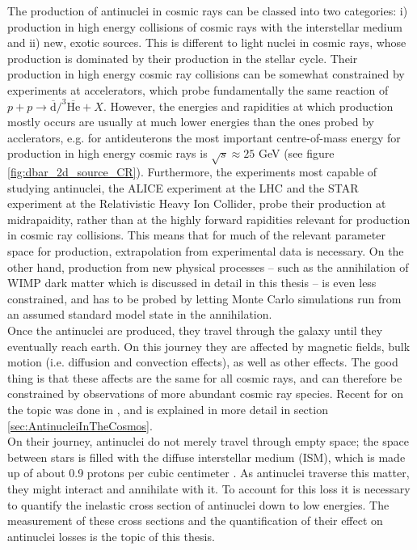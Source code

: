 The production of antinuclei in cosmic rays can be classed into two categories: i) production in high energy collisions of cosmic rays with the interstellar medium and ii) new, exotic sources. This is different to light nuclei in cosmic rays, whose production is dominated by their production in the stellar cycle. Their production in high energy cosmic ray collisions can be somewhat constrained by experiments at accelerators, which probe fundamentally the same reaction of $p + p \rightarrow \overline{\mathrm{d}}/^3{\overline{\mathrm{He}}} + X$. However, the energies and rapidities at which production mostly occurs are usually at much lower energies than the ones probed by acclerators, e.g. for antideuterons the most important centre-of-mass energy for production in high energy cosmic rays is $\sqrt{s}\approx 25$ GeV (see figure \ref{fig:dbar_2d_source_CR}). Furthermore, the experiments most capable of studying antinuclei, the ALICE experiment at the LHC and the STAR experiment\cite{} at the Relativistic Heavy Ion Collider, probe their production at midrapaidity, rather than at the highly forward rapidities relevant for production in cosmic ray collisions. This means that for much of the relevant parameter space for production, extrapolation from experimental data is necessary. On the other hand, production from new physical processes -- such as the annihilation of WIMP dark matter which is discussed in detail in this thesis -- is even less constrained, and has to be probed by letting Monte Carlo simulations run from an assumed standard model state in the annihilation. \\

Once the antinuclei are produced, they travel through the galaxy until they eventually reach earth. On this journey they are affected by magnetic fields, bulk motion (i.e. diffusion and convection effects), as well as other effects. The good thing is that these affects are the same for all cosmic rays, and can therefore be constrained by observations of more abundant cosmic ray species. Recent for on the topic was done in \cite{Boschini:2017fxq, Boschini:2018baj}, and is explained in more detail in section \ref{sec:AntinucleiInTheCosmos}. \\

On their journey, antinuclei do not merely travel through empty space; the space between stars is filled with the diffuse interstellar medium (ISM), which is made up of about 0.9 protons per cubic centimeter \cite{}. As antinuclei traverse this matter, they might interact and annihilate with it. To account for this loss it is necessary to quantify the inelastic cross section of antinuclei down to low energies. The measurement of these cross sections and the quantification of their effect on antinuclei losses is the topic of this thesis. 
